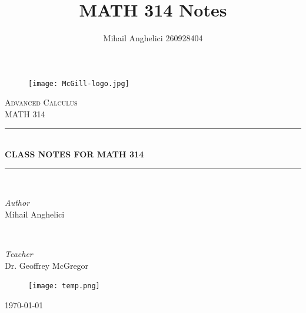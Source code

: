 \documentclass[
	12pt,
	]{article}
\title{MATH 314 Notes}
\author{Mihail Anghelici 260928404}
\date{\empty}
\theoremstyle{custom}
\theoremstyle{custom}
\theoremstyle{custom}
\theoremstyle{custom}
\theoremstyle{custom}
\theoremstyle{definition}
\theoremstyle{example}
\theoremstyle{note}
\theoremstyle{remark}
\theoremstyle{example}
\numberwithin{equation}{subsection}
\begin{document}
	\begin{titlepage}
		\newcommand{\HRule}{\rule{\linewidth}{0.5mm}}

		\center 
		\begin{figure}[h]
			\raggedright
			\texttt{[image: McGill-logo.jpg]}
		\end{figure}
		\textsc{\Large Advanced Calculus}\\[0.5cm] %
		
		\textsc{\large MATH 314}\\[0.5cm] %
		
		\HRule\\[0.4cm]
		
		{\huge\bfseries CLASS NOTES FOR MATH 314 }\\[0.4cm] 
		\HRule\\[1.5cm]
		\begin{minipage}{0.4\textwidth}
			\begin{flushleft}
				\large
				\textit{Author}\\
				Mihail Anghelici %
			\end{flushleft}
		\end{minipage}
		~
		\begin{minipage}{0.4\textwidth}
			\begin{flushright}
				\large
				\textit{Teacher}\\
				Dr. Geoffrey McGregor %
			\end{flushright}
		\end{minipage}
		\vfill\vfill\vfill 
		\begin{figure}[H]
		\centering
		\texttt{[image: temp.png]}
		\end{figure}
		\vfill %
			{\large\today} 
	\end{titlepage}

	\newpage 
	
	\tableofcontents
	\newpage
	
\end{document}
